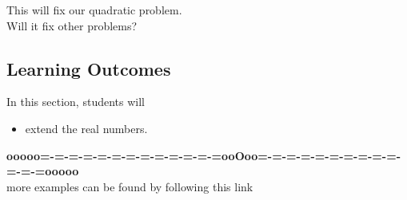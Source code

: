 \documentclass{ximera}
\begin{document}
This will fix our quadratic problem. \\


Will it fix other problems?






\subsection{Learning Outcomes}



\begin{sectionOutcomes}
In this section, students will 

\begin{itemize}
\item extend the real numbers.
\end{itemize}
\end{sectionOutcomes}










\begin{center}
\textbf{\textcolor{green!50!black}{ooooo=-=-=-=-=-=-=-=-=-=-=-=-=ooOoo=-=-=-=-=-=-=-=-=-=-=-=-=ooooo}} \\

more examples can be found by following this link\\ 

\end{center}
\end{document}
